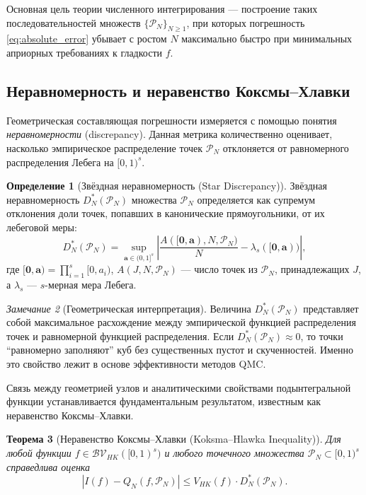\documentclass[12pt, a4paper]{article}
\theoremstyle{plain}
\newtheorem{theorem}{Теорема}[section]
\theoremstyle{definition}
\newtheorem{definition}[theorem]{Определение}
\theoremstyle{remark}
\newtheorem{remark}[theorem]{Замечание}
\newcommand{\II}{[0, 1)}
\newcommand{\va}{\boldsymbol{a}}
\newcommand{\vzero}{\boldsymbol{0}}
\newcommand{\PP}{\mathcal{P}}
\newcommand{\abs}[1]{\left| #1 \right|}
\begin{document}
Основная цель теории численного интегрирования --- построение таких последовательностей множеств $\{\PP_N\}_{N \ge 1}$, при которых погрешность \eqref{eq:absolute_error} убывает с ростом $N$ максимально быстро при минимальных априорных требованиях к гладкости $f$.

\subsection{Неравномерность и неравенство Коксмы--Хлавки}
Геометрическая составляющая погрешности измеряется с помощью понятия \textit{неравномерности} (discrepancy). Данная метрика количественно оценивает, насколько эмпирическое распределение точек $\PP_N$ отклоняется от равномерного распределения Лебега на $\II^s$.

\begin{definition}[Звёздная неравномерность (Star Discrepancy)]
    Звёздная неравномерность $D_N^*(\PP_N)$ множества $\PP_N$ определяется как супремум отклонения доли точек, попавших в канонические прямоугольники, от их лебеговой меры:
    \begin{equation}
        D_N^*(\PP_N) = \sup_{\va \in (0,1]^s} \abs{ \frac{A([\vzero, \va), N, \PP_N)}{N} - \lambda_s([\vzero, \va)) },
        \label{eq:star_discrepancy}
    \end{equation}
    где $[\vzero, \va) = \prod_{i=1}^s [0, a_i)$, $A(J, N, \PP_N)$ --- число точек из $\PP_N$, принадлежащих $J$, а $\lambda_s$ --- $s$-мерная мера Лебега.
\end{definition}

\begin{remark}[Геометрическая интерпретация]
    Величина $D_N^*(\PP_N)$ представляет собой максимальное расхождение между эмпирической функцией распределения точек и равномерной функцией распределения. Если $D_N^*(\PP_N) \approx 0$, то точки ``равномерно заполняют'' куб без существенных пустот и скученностей. Именно это свойство лежит в основе эффективности методов QMC.
\end{remark}

Связь между геометрией узлов и аналитическими свойствами подынтегральной функции устанавливается фундаментальным результатом, известным как неравенство Коксмы--Хлавки.

\begin{theorem}[Неравенство Коксмы--Хлавки (Koksma--Hlawka Inequality)]
    \label{thm:kh_foundation}
    Для любой функции $f \in \mathcal{BV}_{HK}(\II^s)$ и любого точечного множества $\PP_N \subset \II^s$ справедлива оценка
    \begin{equation}
        \abs{I(f) - Q_N(f, \PP_N)} \le V_{HK}(f) \cdot D_N^*(\PP_N).
        \label{eq:kh_inequality}
    \end{equation}
\end{theorem}
\end{document}
